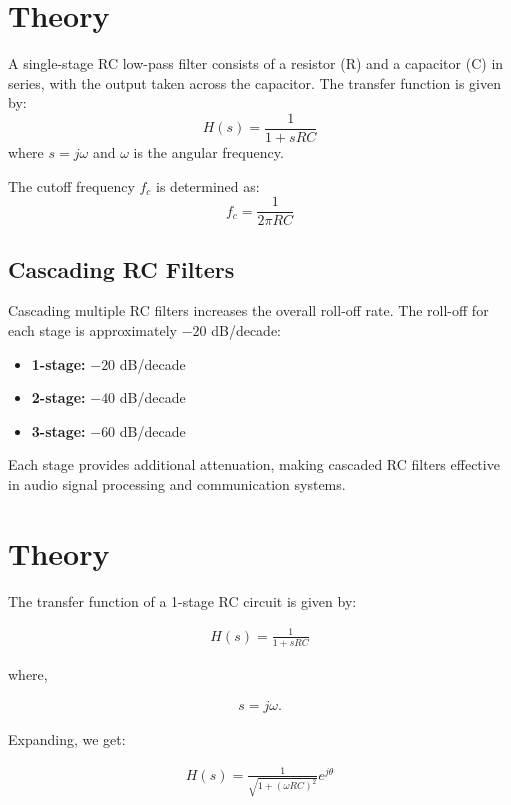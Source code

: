 \documentclass{article}
\begin{document}
\section{Theory}
A single-stage RC low-pass filter consists of a resistor (R) and a capacitor (C) in series, with the output taken across the capacitor. The transfer function is given by:
\begin{equation}
H(s) = \frac{1}{1 + sRC}
\end{equation}
where \( s = j\omega \) and \( \omega \) is the angular frequency.

The cutoff frequency \( f_c \) is determined as:
\begin{equation}
f_c = \frac{1}{2\pi RC}
\end{equation}

\subsection{Cascading RC Filters}
Cascading multiple RC filters increases the overall roll-off rate. The roll-off for each stage is approximately \(-20\) dB/decade:
\begin{itemize}
    \item \textbf{1-stage:} \(-20\) dB/decade
    \item \textbf{2-stage:} \(-40\) dB/decade
    \item \textbf{3-stage:} \(-60\) dB/decade
\end{itemize}
Each stage provides additional attenuation, making cascaded RC filters effective in audio signal processing and communication systems.


\section{Theory}

The transfer function of a 1-stage RC circuit is given by:

\begin{align*}
    H(s) = \frac{1}{1+sRC}
\end{align*}

where,

\begin{align*}
    s = j\omega.
\end{align*}

Expanding, we get:

\begin{align*}
    H(s) = \frac{1}{\sqrt{1+(\omega RC)^2}} e^{j\theta}
\end{align*}
\end{document}
